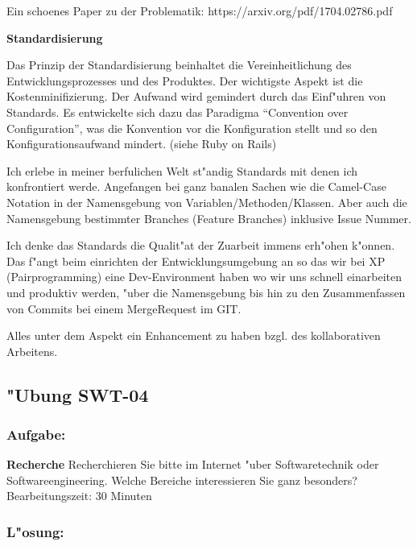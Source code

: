 Ein schoenes Paper zu der Problematik:
https://arxiv.org/pdf/1704.02786.pdf



\textbf{Standardisierung}

Das Prinzip der Standardisierung beinhaltet die Vereinheitlichung des Entwicklungsprozesses und des Produktes. Der wichtigste Aspekt ist die Kostenminifizierung. Der Aufwand wird gemindert durch das Einf"uhren von Standards.
Es entwickelte sich dazu das Paradigma ``Convention over Configuration'', was die Konvention vor die Konfiguration stellt und so den Konfigurationsaufwand mindert. (siehe Ruby on Rails)

Ich erlebe in meiner berfulichen Welt st"andig Standards mit denen ich konfrontiert werde.
Angefangen bei ganz banalen Sachen wie die Camel-Case Notation in der Namensgebung von Variablen/Methoden/Klassen.
Aber auch die Namensgebung bestimmter Branches (Feature Branches) inklusive Issue Nummer.

Ich denke das Standards die Qualit"at der Zuarbeit immens erh"ohen k"onnen.
Das f"angt beim einrichten der Entwicklungsumgebung an so das wir bei XP (Pairprogramming) eine Dev-Environment haben wo wir uns schnell einarbeiten und produktiv werden, "uber die Namensgebung bis hin zu den Zusammenfassen von Commits bei einem MergeRequest im GIT.

Alles unter dem Aspekt ein Enhancement zu haben bzgl. des kollaborativen Arbeitens.


\newpage
\subsection{"Ubung SWT-04}
\subsubsection*{Aufgabe:}

\begin{framed}
\textbf{Recherche}
\smallbreak
Recherchieren Sie bitte im Internet "uber Softwaretechnik oder Softwareengineering. Welche Bereiche interessieren Sie ganz besonders?
\bigbreak
\small Bearbeitungszeit: 30 Minuten
\end{framed}
\bigbreak
\bigbreak
\subsubsection*{L"osung:}

